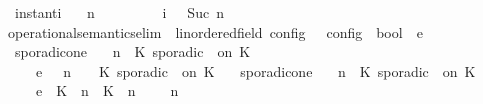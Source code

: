 \begin{isabellebody}
\ \ instant{\isacharunderscore}i{\isacharcolon}\isanewline
\ \ {\isachardoublequoteopen}{\isacharparenleft}{\isasymGamma}{\isacharcomma}\ n\ {\isasymturnstile}\ {\isacharbrackleft}{\isacharbrackright}\ {\isasymtriangleright}\ {\isasymPhi}{\isacharparenright}\isanewline
\ \ \ \ \ {\isasymhookrightarrow}\isactrlsub i\ \ {\isacharparenleft}{\isasymGamma}{\isacharcomma}\ Suc\ n\ {\isasymturnstile}\ {\isasymPhi}\ {\isasymtriangleright}\ {\isacharbrackleft}{\isacharbrackright}{\isacharparenright}{\isachardoublequoteclose}\isanewline
\isanewline
{}\isamarkupfalse%
\ operational{\isacharunderscore}semantics{\isacharunderscore}elim\ {\isacharcolon}{\isacharcolon}\ {\isachardoublequoteopen}{\isacharparenleft}{\isacharprime}{\isasymtau}{\isacharcolon}{\isacharcolon}linordered{\isacharunderscore}field{\isacharparenright}\ config\ {\isasymRightarrow}\ {\isacharprime}{\isasymtau}\ config\ {\isasymRightarrow}\ bool{\isachardoublequoteclose}\ {\isacharparenleft}{\isachardoublequoteopen}{\isacharunderscore}\ {\isasymhookrightarrow}\isactrlsub e\ {\isacharunderscore}{\isachardoublequoteclose}\ {}{}{\isacharparenright}\ \isanewline
\ \ sporadic{\isacharunderscore}on{\isacharunderscore}e{}{\isacharcolon}\isanewline
\ \ {\isachardoublequoteopen}{\isacharparenleft}{\isasymGamma}{\isacharcomma}\ n\ {\isasymturnstile}\ {\isacharparenleft}{\isacharparenleft}K\ sporadic\ {\isasymtau}\ on\ K\ {\isacharhash}\ {\isasymPsi}{\isacharparenright}\ {\isasymtriangleright}\ {\isasymPhi}{\isacharparenright}\isanewline
\ \ \ \ \ {\isasymhookrightarrow}\isactrlsub e\ \ {\isacharparenleft}{\isasymGamma}{\isacharcomma}\ n\ {\isasymturnstile}\ {\isasymPsi}\ {\isasymtriangleright}\ {\isacharparenleft}{\isacharparenleft}K\ sporadic\ {\isasymtau}\ on\ K\ {\isacharhash}\ {\isasymPhi}{\isacharparenright}{\isacharparenright}{\isachardoublequoteclose}\isanewline
{\isacharbar}\ sporadic{\isacharunderscore}on{\isacharunderscore}e{}{\isacharcolon}\isanewline
\ \ {\isachardoublequoteopen}{\isacharparenleft}{\isasymGamma}{\isacharcomma}\ n\ {\isasymturnstile}\ {\isacharparenleft}{\isacharparenleft}K\ sporadic\ {\isasymtau}\ on\ K\ {\isacharhash}\ {\isasymPsi}{\isacharparenright}\ {\isasymtriangleright}\ {\isasymPhi}{\isacharparenright}\isanewline
\ \ \ \ \ {\isasymhookrightarrow}\isactrlsub e\ \ {\isacharparenleft}{\isacharparenleft}{\isacharparenleft}K\ {\isasymUp}\ n{\isacharparenright}\ {\isacharhash}\ {\isacharparenleft}K\ {\isasymDown}\ n\ {\isacharat}\ {\isasymtau}{\isacharparenright}\ {\isacharhash}\ {\isasymGamma}{\isacharparenright}{\isacharcomma}\ n\ {\isasymturnstile}\ {\isasymPsi}\ {\isasymtriangleright}\ {\isasymPhi}{\isacharparenright}{\isachardoublequoteclose}\isanewline

\end{isabellebody}
